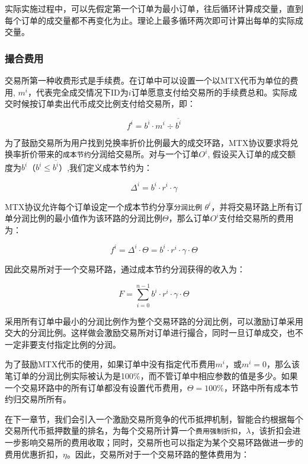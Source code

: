 \documentclass[UTF8,nofonts]{ctexart}
\begin{document}
实际实施过程中，可以先假定第一个订单为最小订单，往后循环计算成交量，直到每个订单的成交量都不再变化为止。理论上最多循环两次即可计算出每单的实际成交量。

\subsubsection{撮合费用\label{sec:fee}}

交易所第一种收费形式是手续费。在订单中可以设置一个以MTX代币为单位的费用, $m^i$，代表完全成交情况下ID为$i$订单愿意支付给交易所的手续费总和。实际成交时候按订单卖出代币成交比例支付给交易所，即：

\begin{equation*}
f^i = b^i \cdot m^i  \div \overline{b^i}
\end{equation*}


为了鼓励交易所为用户找到兑换率折价比例最大的成交环路，MTX协议要求将兑换率折价带来的\texttt{成本节约}分润给交易所。对与一个订单$O^i$, 假设买入订单的成交额度为$b^i$（$b^i \le \overline{b^i}$）,我们定义成本节约为：

\begin{equation*}
\Delta^i = b^i \cdot r^i \cdot \gamma
\end{equation*}

MTX协议允许每个订单设定一个成本节约分享\texttt{分润比例} $\theta^i$，并将交易环路上所有订单分润比例的最小值作为该环路的分润比例$\Theta$，那么订单$O^i$支付给交易所的费用为：

\begin{equation*}
f^i = \Delta^i \cdot \Theta = b^i \cdot r^i \cdot \gamma \cdot \Theta
\end{equation*}

因此交易所对于一个交易环路，通过成本节约分润获得的收入为：

\begin{equation*}
F = \sum^{n-1}_{i=0} b^i \cdot r^i \cdot \gamma \cdot \Theta
\end{equation*}

采用所有订单中最小的分润比例作为整个交易环路的分润比例，可以激励订单采用交大的分润比例。这样做会激励交易所对订单进行撮合，同时一旦订单成交，也不一定非要支付指定比例的分润。


为了鼓励MTX代币的使用，如果订单中没有指定代币费用$m^i$，或$m^i=0$，那么该笔订单的分润比例实际被认为是100\%，而不管订单中相应参数的值是多少。如果一个交易环路中的所有订单都没有设置代币费用，$\Theta=100\%$，环路中所有成本节约归交易所所有。

在下一章节，我们会引入一个激励交易所竞争的代币抵押机制，智能合约根据每个交易所代币抵押数量的排名，为每个交易所计算一个\texttt{费用强制折扣}，$\lambda$，该折扣会进一步影响交易所的费用收取；同时，交易所也可以指定为某个交易环路做进一步的费用优惠折扣，$\eta$。因此，交易所对于一个交易环路的整体费用为：
\end{document}
